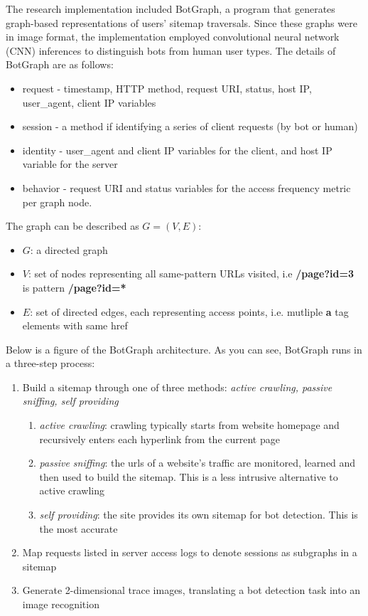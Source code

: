 The research implementation included BotGraph, a program that generates graph-based representations of users' sitemap traversals.
Since these graphs were in image format, the implementation employed convolutional neural network (CNN) inferences to distinguish bots from human user types.
The details of BotGraph are as follows:
\begin{itemize}
    \item request - timestamp, HTTP method, request URI, status, host IP, user{\_}agent, client IP variables
    \item session - a method if identifying a series of client requests (by bot or human)
    \item identity - user{\_}agent and client IP variables for the client, and host IP variable for the server
    \item behavior - request URI and status variables for the access frequency metric per graph node.
\end{itemize}
The graph can be described as $G = (V, E)$:
\begin{itemize}
    \item $G$: a directed graph
    \item $V$: set of nodes representing all same-pattern URLs visited, i.e \textbf{/page?id=3} is pattern \textbf{/page?id=*}
    \item $E$: set of directed edges, each representing access points, i.e. mutliple \textbf{a} tag elements with same href
\end{itemize}
Below is a figure of the BotGraph architecture. As you can see, BotGraph runs in a three-step process:
\begin{enumerate}
    \item Build a sitemap through one of three methods: \textit{active crawling, passive sniffing, self providing}
    \begin {enumerate}
        \item \textit{active crawling}: crawling typically starts from website homepage and recursively enters each hyperlink from the current page
        \item \textit{passive sniffing}: the urls of a website’s traffic are monitored, learned and then used to build the sitemap. This is a less intrusive alternative to active crawling
        \item \textit{self providing}: the site provides its own sitemap for bot detection. This is the most accurate
    \end{enumerate}
    \item Map requests listed in server access logs to denote sessions as subgraphs in a sitemap
    \item Generate 2-dimensional trace images, translating a bot detection task into an image recognition
\end{enumerate}
